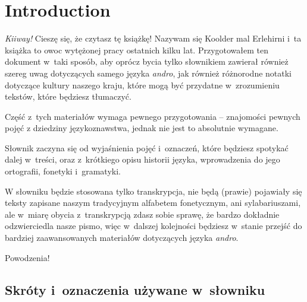 \setcounter{chapter}{-1}
\chapter{Introduction}
\label{ch:introduction}



\emph{Kiiway!} Cieszę się, że czytasz tę książkę! Nazywam się Koolder mal
Erlehirni i~ta książka to owoc wytężonej pracy ostatnich kilku lat.
Przygotowałem ten dokument w~taki sposób, aby oprócz bycia tylko słownikiem
zawierał również szereg uwag dotyczących samego języka \emph{andro}, jak
również różnorodne notatki dotyczące kultury naszego kraju, które mogą być
przydatne w~zrozumieniu tekstów, które będziesz tłumaczyć.

Część z~tych materiałów wymaga pewnego przygotowania -- znajomości pewnych pojęć
z dziedziny językoznawstwa, jednak nie jest to absolutnie wymagane.

Słownik zaczyna się od wyjaśnienia pojęć i~oznaczeń, które będziesz spotykać
dalej w~treści, oraz z~krótkiego opisu historii języka, wprowadzenia do jego
ortografii, fonetyki i~gramatyki.

W słowniku będzie stosowana tylko transkrypcja, nie będą (prawie) pojawiały się
teksty zapisane naszym tradycyjnym alfabetem fonetycznym, ani sylabariuszami,
ale w~miarę obycia z~transkrypcją zdasz sobie sprawę, że bardzo dokładnie
odzwierciedla nasze pismo, więc w~dalszej kolejności będziesz w~stanie przejść
do bardziej zaawansowanych materiałów dotyczących języka \emph{andro}.

\bigskip

Powodzenia!

\section[Skróty i~oznaczenia]{Skróty i~oznaczenia używane w~słowniku}

